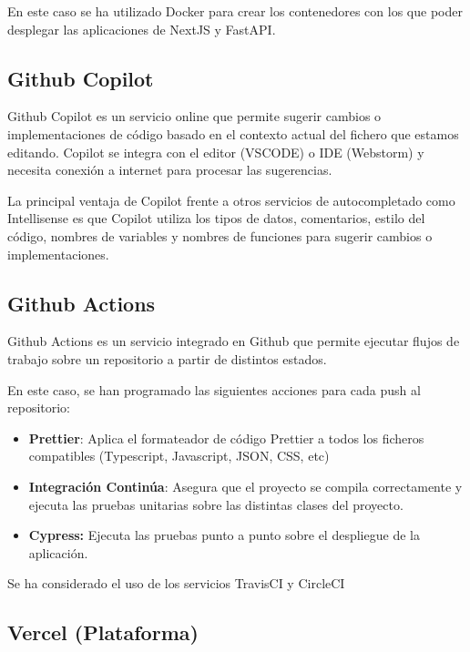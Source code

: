 En este caso se ha utilizado Docker para crear los contenedores con los
que poder desplegar las aplicaciones de NextJS y FastAPI.

\hypertarget{github-copilot}{%
\subsection{Github Copilot}\label{github-copilot}}

Github Copilot es un servicio online que permite sugerir cambios o
implementaciones de código basado en el contexto actual del fichero que
estamos editando. Copilot se integra con el editor (VSCODE) o IDE
(Webstorm) y necesita conexión a internet para procesar las sugerencias.

La principal ventaja de Copilot frente a otros servicios de
autocompletado como Intellisense es que Copilot utiliza los tipos de
datos, comentarios, estilo del código, nombres de variables y nombres de
funciones para sugerir cambios o implementaciones.

\hypertarget{github-actions}{%
\subsection{Github Actions}\label{github-actions}}

Github Actions es un servicio integrado en Github que permite ejecutar
flujos de trabajo sobre un repositorio a partir de distintos estados.

En este caso, se han programado las siguientes acciones para cada push
al repositorio:

\begin{itemize}
\item
  \textbf{Prettier}: Aplica el formateador de código Prettier a todos
  los ficheros compatibles (Typescript, Javascript, JSON, CSS, etc)
\item
  \textbf{Integración Continúa}: Asegura que el proyecto se compila
  correctamente y ejecuta las pruebas unitarias sobre las distintas
  clases del proyecto.
\item
  \textbf{Cypress:} Ejecuta las pruebas punto a punto sobre el
  despliegue de la aplicación.
\end{itemize}

Se ha considerado el uso de los servicios TravisCI y CircleCI

\hypertarget{vercel-plataforma}{%
\subsection{Vercel (Plataforma)}\label{vercel-plataforma}}

